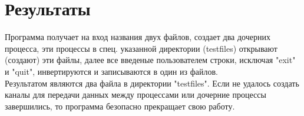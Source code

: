 \section{Результаты}

Программа получает на вход названия двух файлов, создает два дочерних процесса, эти процессы в спец. указанной директории (testfiles) открывают (создают) эти файлы,  далее все введеные пользователем строки, исключая "exit" и "quit", инвертируются и записываются в один из файлов. \\
Результатом являются два файла в директории "testfiles". Если не удалось создать каналы для передачи данных между процессами или дочерние процессы завершились, то программа безопасно прекращает свою работу.

